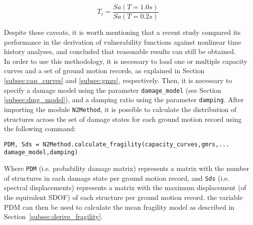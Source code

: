 \begin{equation}
T_c = \frac{Sa(T=1.0s)}{Sa(T=0.2s)}
\end{equation}

Despite these caveats, it is worth mentioning that a recent study \citep{SilvaEtAl2014b} compared its performance in the derivation of vulnerability functions against nonlinear time history analyses, and concluded that reasonable results can still be obtained.\\

In order to use this methodology, it is necessary to load one or multiple capacity curves and a set of ground motion records, as explained in Section \ref{subsec:cap_curves} and \ref{subsec:gmrs}, respectively. Then, it is necessary to specify a damage model using the parameter \verb=damage_model= (see Section \ref{subsec:dmg_model}), and a damping ratio using the parameter \verb=damping=. After importing the module \verb=N2Method=, it is possible to calculate the distribution of structures across the set of damage states for each ground motion record using the following command:

\begin{Verbatim}[frame=single, commandchars=\\\{\}, samepage=true]
PDM, Sds = N2Method.calculate_fragility(capacity_curves,gmrs,...
damage_model,damping)
\end{Verbatim}

Where \verb=PDM= (i.e. probability damage matrix) represents a matrix with the number of structures in each damage state per ground motion record, and \verb=Sds= (i.e. spectral displacements) represents a matrix with the maximum displacement (of the equivalent SDOF) of each structure per ground motion record. the variable PDM can then be used to calculate the mean fragility model as described in Section~\ref{subsec:derive_fragility}.
